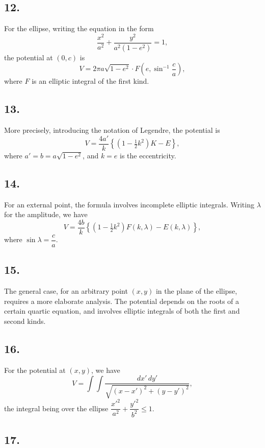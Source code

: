 \documentclass[11pt,a4paper]{article}
\begin{document}
\subsection*{12.}

For the ellipse, writing the equation in the form
\[
\frac{x^2}{a^2} + \frac{y^2}{a^2(1-e^2)} = 1,
\]
the potential at $(0,c)$ is
\[
V = 2\pi a\sqrt{1-e^2}\cdot F\left(e, \sin^{-1}\frac{c}{a}\right),
\]
where $F$ is an elliptic integral of the first kind.

\newpage
\subsection*{13.}

More precisely, introducing the notation of Legendre, the potential is
\[
V = \frac{4a'}{k}\left\{(1-\tfrac{1}{2}k^2)K - E\right\},
\]
where $a'=b=a\sqrt{1-e^2}$, and $k=e$ is the eccentricity.

\subsection*{14.}

For an external point, the formula involves incomplete elliptic integrals.
Writing $\lambda$ for the amplitude, we have
\[
V = \frac{4b}{k}\left\{
      (1-\tfrac{1}{2}k^2)F(k,\lambda) - E(k,\lambda)
    \right\},
\]
where $\sin\lambda = \dfrac{c}{a}$.

\subsection*{15.}

The general case, for an arbitrary point $(x,y)$ in the plane of the
ellipse, requires a more elaborate analysis. The potential depends on the
roots of a certain quartic equation, and involves elliptic integrals of both
the first and second kinds.

\subsection*{16.}

For the potential at $(x,y)$, we have
\[
V = \int\!\!\!\int \frac{dx'\,dy'}{\sqrt{(x-x')^2+(y-y')^2}},
\]
the integral being over the ellipse $\dfrac{x'^2}{a^2}+\dfrac{y'^2}{b^2}\leq 1$.

\newpage
\subsection*{17.}
\end{document}
